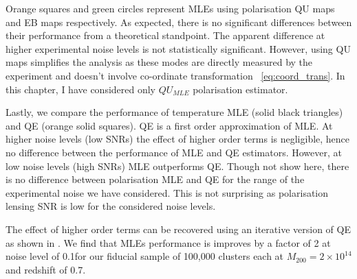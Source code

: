  Orange squares and green circles represent MLEs using polarisation QU maps and EB maps respectively. 
 As expected, there is no significant differences between their performance from a theoretical standpoint. 
 The apparent difference at higher experimental noise levels is not statistically significant.
 However, using QU maps simplifies the analysis as these modes are directly measured by the experiment and doesn't involve co-ordinate transformation ~\ref{eq:coord_trans}. In this chapter, I have considered only $QU_{MLE}$ polarisation estimator.
 
  
 Lastly, we compare the performance of temperature MLE (solid black triangles) and QE (orange solid squares). 
 QE is a first order approximation of MLE.
 At higher noise levels (low SNRs) the effect of higher order terms is negligible, hence no difference between the performance of MLE and QE estimators.
 However, at low noise levels (high SNRs) MLE outperforms QE. 
  Though not show here, there is no difference between polarisation MLE and QE for the range of the experimental noise we have considered.
  This is not surprising as polarisation lensing SNR is low for the considered noise levels.
 
 The effect of higher order terms can be recovered using an iterative version of QE as shown in \cite{Yoo and Zaldarriaga}.
 We find that MLEs performance is improves by a factor of 2 at noise level of 0.1\ukam  for our fiducial sample of 100,000 clusters each at  $M_{200} = 2 \times 10^{14}$ \msolar and redshift of 0.7. 
  
